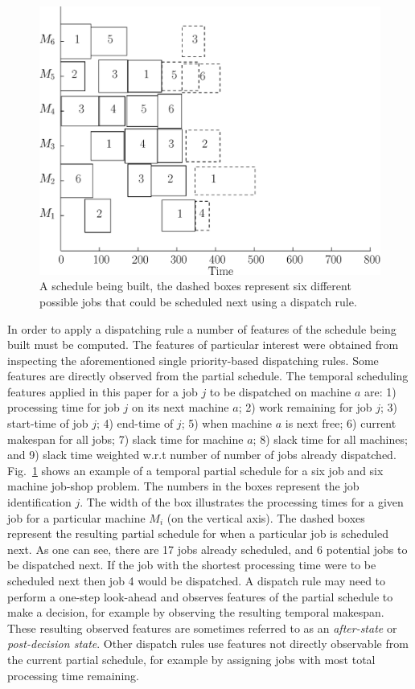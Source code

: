 \documentclass[10pt]{llncs}
\begin{document}
\begin{figure}[b!]
\centering
\includegraphics[width=0.8\columnwidth]{figs/dispatch_features.eps}
\caption{A schedule being built, the dashed boxes represent six different possible jobs that could be scheduled next using a dispatch rule.}
\label{fig:dispatch_example}
\end{figure}

In order to apply a dispatching rule a number of features of the schedule being built must be computed. The features of particular interest were obtained from inspecting the aforementioned single priority-based dispatching rules. Some features are directly observed from the partial schedule. The temporal scheduling features applied in this paper for a job $j$ to be dispatched on machine $a$ are: 1) processing time for job $j$ on its next machine $a$; 2) work remaining for job $j$; 3) start-time of job $j$; 4) end-time of $j$; 5) when machine $a$ is next free; 6) current makespan for all jobs; 7) slack time for machine $a$; 8) slack time for all machines; and 9) slack time weighted w.r.t number of number of jobs already dispatched.
Fig.~\ref{fig:dispatch_example} shows an example of a temporal partial schedule for a six job and six machine job-shop problem. The numbers in the boxes represent the job identification $j$. The width of the box illustrates the processing times for a given job for a particular machine $M_i$ (on the vertical axis). The dashed boxes represent the resulting partial schedule for when a particular job is scheduled next. As one can see, there are 17 jobs already scheduled, and 6 potential jobs to be dispatched next. If the job with the shortest processing time were to be scheduled next then job 4 would be dispatched. A dispatch rule may need to perform a one-step look-ahead and observes features of the partial schedule to make a decision, for example by observing the resulting temporal makespan. These resulting observed features are sometimes referred to as an \emph{after-state} or \emph{post-decision state}. Other dispatch rules use features not directly observable from the current partial schedule, for example by assigning jobs with most total processing time remaining. %
\end{document}
